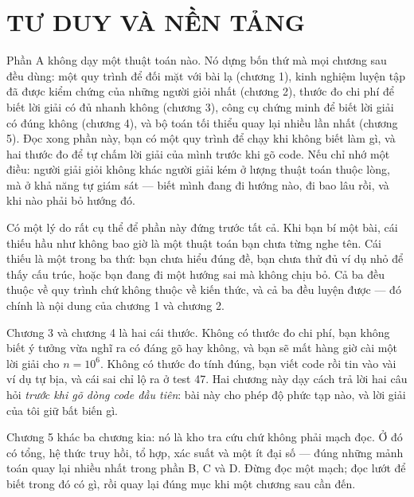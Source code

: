 \documentclass[../algorithm.tex]{subfiles}
\begin{document}
\part{TƯ DUY VÀ NỀN TẢNG}
\begin{tomtat}
Phần A không dạy một thuật toán nào. Nó dựng bốn thứ mà mọi chương sau đều dùng: một quy trình để đối mặt với bài lạ (chương 1), kinh nghiệm luyện tập đã được kiểm chứng của những người giỏi nhất (chương 2), thước đo chi phí để biết lời giải có đủ nhanh không (chương 3), công cụ chứng minh để biết lời giải có đúng không (chương 4), và bộ toán tối thiểu quay lại nhiều lần nhất (chương 5). Đọc xong phần này, bạn có một quy trình để chạy khi không biết làm gì, và hai thước đo để tự chấm lời giải của mình trước khi gõ code. Nếu chỉ nhớ một điều: người giải giỏi không khác người giải kém ở lượng thuật toán thuộc lòng, mà ở khả năng tự giám sát --- biết mình đang đi hướng nào, đi bao lâu rồi, và khi nào phải bỏ hướng đó.
\end{tomtat}

Có một lý do rất cụ thể để phần này đứng trước tất cả. Khi bạn bí một bài, cái thiếu hầu như không bao giờ là một thuật toán bạn chưa từng nghe tên. Cái thiếu là một trong ba thứ: bạn chưa hiểu đúng đề, bạn chưa thử đủ ví dụ nhỏ để thấy cấu trúc, hoặc bạn đang đi một hướng sai mà không chịu bỏ. Cả ba đều thuộc về quy trình chứ không thuộc về kiến thức, và cả ba đều luyện được --- đó chính là nội dung của chương 1 và chương 2.

Chương 3 và chương 4 là hai cái thước. Không có thước đo chi phí, bạn không biết ý tưởng vừa nghĩ ra có đáng gõ hay không, và bạn sẽ mất hàng giờ cài một lời giải  cho \(n = 10^6\). Không có thước đo tính đúng, bạn viết code rồi tin vào vài ví dụ tự bịa, và cái sai chỉ lộ ra ở test 47. Hai chương này dạy cách trả lời hai câu hỏi \emph{trước khi gõ dòng code đầu tiên}: bài này cho phép độ phức tạp nào, và lời giải của tôi giữ bất biến gì.

Chương 5 khác ba chương kia: nó là kho tra cứu chứ không phải mạch đọc. Ở đó có tổng, hệ thức truy hồi, tổ hợp, xác suất và một ít đại số --- đúng những mảnh toán quay lại nhiều nhất trong phần B, C và D. Đừng đọc một mạch; đọc lướt để biết trong đó có gì, rồi quay lại đúng mục khi một chương sau cần đến.






\ifSubfilesClassLoaded{\printbibliography[title={Nguồn}]}{}
\end{document}
